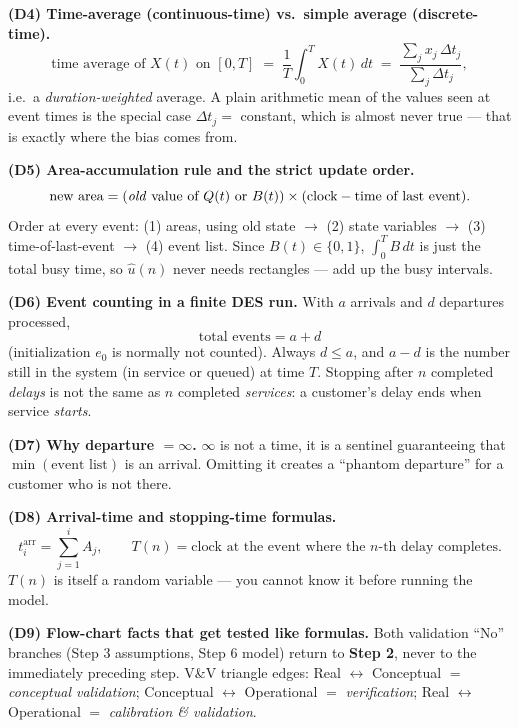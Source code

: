 \begin{derivedbox}
\smallskip
\textbf{(D4) Time-average (continuous-time) vs.\ simple average (discrete-time).}
\[
\text{time average of } X(t) \text{ on } [0,T] \;=\; \frac{1}{T}\int_0^T X(t)\,dt \;=\; \frac{\sum_j x_j\,\Delta t_j}{\sum_j \Delta t_j},
\]
i.e.\ a \emph{duration-weighted} average. A plain arithmetic mean of the values seen at event times is the special case $\Delta t_j = $ constant, which is almost never true --- that is exactly where the bias comes from.

\smallskip
\textbf{(D5) Area-accumulation rule and the strict update order.}
\[
\text{new area} = (\text{\emph{old} value of } Q(t)\text{ or }B(t)) \times (\text{clock} - \text{time of last event}).
\]
Order at every event: (1) areas, using old state $\to$ (2) state variables $\to$ (3) time-of-last-event $\to$ (4) event list.
Since $B(t)\in\{0,1\}$, $\int_0^T B\,dt$ is just the total busy time, so $\hat u(n)$ never needs rectangles --- add up the busy intervals.

\smallskip
\textbf{(D6) Event counting in a finite DES run.} With $a$ arrivals and $d$ departures processed,
\[
\text{total events} = a + d
\]
(initialization $e_0$ is normally not counted). Always $d \le a$, and $a - d$ is the number still in the system (in service or queued) at time $T$. Stopping after $n$ completed \emph{delays} is not the same as $n$ completed \emph{services}: a customer's delay ends when service \emph{starts}.

\smallskip
\textbf{(D7) Why departure $=\infty$.} $\infty$ is not a time, it is a sentinel guaranteeing that $\min(\text{event list})$ is an arrival. Omitting it creates a ``phantom departure'' for a customer who is not there.

\smallskip
\textbf{(D8) Arrival-time and stopping-time formulas.}
\[
t^{\text{arr}}_i = \sum_{j=1}^{i} A_j, \qquad T(n) = \text{clock at the event where the } n\text{-th delay completes}.
\]
$T(n)$ is itself a random variable --- you cannot know it before running the model.

\smallskip
\textbf{(D9) Flow-chart facts that get tested like formulas.} Both validation ``No'' branches (Step 3 assumptions, Step 6 model) return to \textbf{Step 2}, never to the immediately preceding step. V\&V triangle edges: Real $\leftrightarrow$ Conceptual $=$ \emph{conceptual validation}; Conceptual $\leftrightarrow$ Operational $=$ \emph{verification}; Real $\leftrightarrow$ Operational $=$ \emph{calibration \& validation}.
\end{derivedbox}

